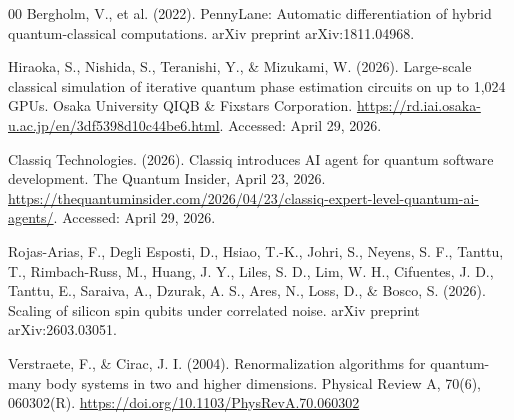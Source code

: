 \documentclass[preprint,12pt, a4paper]{elsarticle}
\begin{document}
\begin{thebibliography}{00}
 Bergholm, V., et al. (2022). PennyLane: Automatic differentiation of hybrid quantum-classical computations. arXiv preprint arXiv:1811.04968.

 Hiraoka, S., Nishida, S., Teranishi, Y., \& Mizukami, W. (2026). Large-scale classical simulation of iterative quantum phase estimation circuits on up to 1,024 GPUs. Osaka University QIQB \& Fixstars Corporation. \url{https://rd.iai.osaka-u.ac.jp/en/3df5398d10c44be6.html}. Accessed: April 29, 2026.

 Classiq Technologies. (2026). Classiq introduces AI agent for quantum software development. The Quantum Insider, April 23, 2026. \url{https://thequantuminsider.com/2026/04/23/classiq-expert-level-quantum-ai-agents/}. Accessed: April 29, 2026.

 Rojas-Arias, F., Degli Esposti, D., Hsiao, T.-K., Johri, S., Neyens, S. F., Tanttu, T., Rimbach-Russ, M., Huang, J. Y., Liles, S. D., Lim, W. H., Cifuentes, J. D., Tanttu, E., Saraiva, A., Dzurak, A. S., Ares, N., Loss, D., \& Bosco, S. (2026). Scaling of silicon spin qubits under correlated noise. arXiv preprint arXiv:2603.03051.

 Verstraete, F., \& Cirac, J. I. (2004). Renormalization algorithms for quantum-many body systems in two and higher dimensions. Physical Review A, 70(6), 060302(R). \url{https://doi.org/10.1103/PhysRevA.70.060302}

\end{thebibliography}
\end{document}
